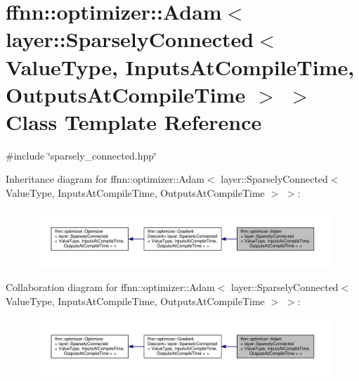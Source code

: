 \hypertarget{classffnn_1_1optimizer_1_1_adam_3_01layer_1_1_sparsely_connected_3_01_value_type_00_01_inputs_at5101e46d32858ec2169acdeede08d723}{\section{ffnn\-:\-:optimizer\-:\-:Adam$<$ layer\-:\-:Sparsely\-Connected$<$ Value\-Type, Inputs\-At\-Compile\-Time, Outputs\-At\-Compile\-Time $>$ $>$ Class Template Reference}
\label{classffnn_1_1optimizer_1_1_adam_3_01layer_1_1_sparsely_connected_3_01_value_type_00_01_inputs_at5101e46d32858ec2169acdeede08d723}
}


{\ttfamily \#include \char`\"{}sparsely\-\_\-connected.\-hpp\char`\"{}}



Inheritance diagram for ffnn\-:\-:optimizer\-:\-:Adam$<$ layer\-:\-:Sparsely\-Connected$<$ Value\-Type, Inputs\-At\-Compile\-Time, Outputs\-At\-Compile\-Time $>$ $>$\-:\nopagebreak
\begin{figure}[H]
\begin{center}
\leavevmode
\includegraphics[width=350pt]{classffnn_1_1optimizer_1_1_adam_3_01layer_1_1_sparsely_connected_3_01_value_type_00_01_inputs_atceca5391622640783f2a5e090f69ef26}
\end{center}
\end{figure}


Collaboration diagram for ffnn\-:\-:optimizer\-:\-:Adam$<$ layer\-:\-:Sparsely\-Connected$<$ Value\-Type, Inputs\-At\-Compile\-Time, Outputs\-At\-Compile\-Time $>$ $>$\-:\nopagebreak
\begin{figure}[H]
\begin{center}
\leavevmode
\includegraphics[width=350pt]{classffnn_1_1optimizer_1_1_adam_3_01layer_1_1_sparsely_connected_3_01_value_type_00_01_inputs_atb682edad999429458f7de6145c1fc052}
\end{center}
\end{figure}
